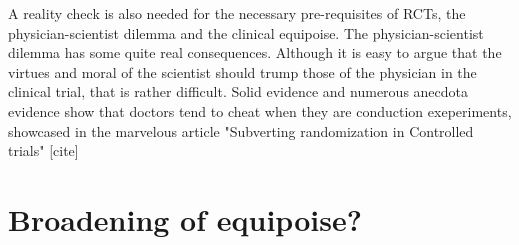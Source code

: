 \documentclass[12p]{article}
\begin{document}
A reality check is also needed for the necessary pre-requisites of RCTs, the physician-scientist dilemma and the clinical equipoise.
The physician-scientist dilemma has some quite real consequences.
Although it is easy to argue that the virtues and moral of the scientist should trump those of the physician in the clinical trial, that is rather difficult.
Solid evidence and numerous anecdota evidence show that doctors tend to cheat when they are conduction exeperiments, showcased in the marvelous article "Subverting randomization in Controlled trials" [cite]




\section*{Broadening of equipoise?}


%
\end{document}
